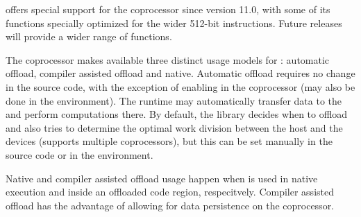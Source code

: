 \documentclass[../thesis]{subfiles}
\begin{document}
	\intel\mkl offers special support for the \intel\xeonphi coprocessor since version 11.0, with some of its functions specially optimized for the wider 512-bit \simd instructions. Future releases will provide a wider range of functions.

	The coprocessor makes available three distinct usage models for \mkl: automatic offload, compiler assisted offload and native. Automatic offload requires no change in the source code, with the exception of enabling \mkl in the coprocessor (may also be done in the environment). The runtime may automatically transfer data to the \xeonphi and perform computations there. By default, the library decides when to offload and also tries to determine the optimal work division between the host and the devices (\mkl supports multiple coprocessors), but this can be set manually in the source code or in the environment.

	Native and compiler assisted offload usage happen when \mkl is used in native execution and inside an offloaded code region, respecitvely. Compiler assisted offload has the advantage of allowing for data persistence on the coprocessor.
\end{document}

